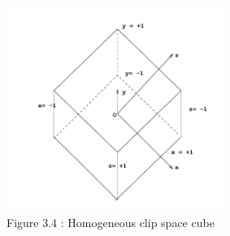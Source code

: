 \documentclass[
11pt, %
english, %
singlespacing, %
headsepline, %
]{MastersDoctoralThesis} %
\begin{document}
\begin{center}
\includegraphics[width=200pt]{3-4}
\\ Figure 3.4 : Homogeneous clip space cube
\end{center}
\end{document}
